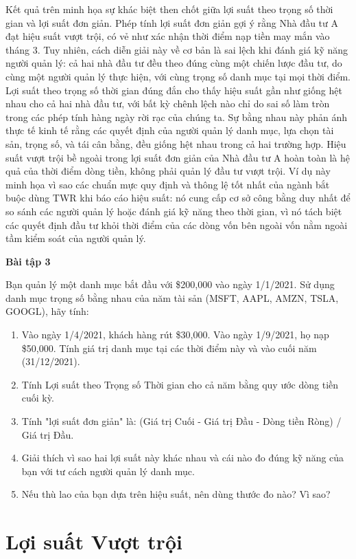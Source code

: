 Kết quả trên minh họa sự khác biệt then chốt giữa lợi suất theo trọng số thời gian và lợi suất đơn giản. Phép tính lợi suất đơn giản gợi ý rằng Nhà đầu tư A đạt hiệu suất vượt trội, có vẻ như xác nhận thời điểm nạp tiền may mắn vào tháng 3. Tuy nhiên, cách diễn giải này về cơ bản là sai lệch khi đánh giá kỹ năng người quản lý: cả hai nhà đầu tư đều theo đúng cùng một chiến lược đầu tư, do cùng một người quản lý thực hiện, với cùng trọng số danh mục tại mọi thời điểm. Lợi suất theo trọng số thời gian đúng đắn cho thấy hiệu suất gần như giống hệt nhau cho cả hai nhà đầu tư, với bất kỳ chênh lệch nào chỉ do sai số làm tròn trong các phép tính hàng ngày rời rạc của chúng ta. Sự bằng nhau này phản ánh thực tế kinh tế rằng các quyết định của người quản lý danh mục, lựa chọn tài sản, trọng số, và tái cân bằng, đều giống hệt nhau trong cả hai trường hợp. Hiệu suất vượt trội bề ngoài trong lợi suất đơn giản của Nhà đầu tư A hoàn toàn là hệ quả của thời điểm dòng tiền, không phải quản lý đầu tư vượt trội. Ví dụ này minh họa vì sao các chuẩn mực quy định và thông lệ tốt nhất của ngành bắt buộc dùng TWR khi báo cáo hiệu suất: nó cung cấp cơ sở công bằng duy nhất để so sánh các người quản lý hoặc đánh giá kỹ năng theo thời gian, vì nó tách biệt các quyết định đầu tư khỏi thời điểm của các dòng vốn bên ngoài vốn nằm ngoài tầm kiểm soát của người quản lý.

\textbf{Bài tập 3}

Bạn quản lý một danh mục bắt đầu với \$200,000 vào ngày 1/1/2021. Sử dụng danh mục trọng số bằng nhau của năm tài sản (MSFT, AAPL, AMZN, TSLA, GOOGL), hãy tính:

\begin{enumerate}
  \item[a)] Vào ngày 1/4/2021, khách hàng rút \$30,000. Vào ngày 1/9/2021, họ nạp \$50,000. Tính giá trị danh mục tại các thời điểm này và vào cuối năm (31/12/2021).
  \item[b)] Tính Lợi suất theo Trọng số Thời gian cho cả năm bằng quy ước dòng tiền cuối kỳ.
  \item[c)] Tính "lợi suất đơn giản" là: (Giá trị Cuối - Giá trị Đầu - Dòng tiền Ròng) / Giá trị Đầu.
  \item[d)] Giải thích vì sao hai lợi suất này khác nhau và cái nào đo đúng kỹ năng của bạn với tư cách người quản lý danh mục.
  \item[e)] Nếu thù lao của bạn dựa trên hiệu suất, nên dùng thước đo nào? Vì sao?
\end{enumerate}

\section{Lợi suất Vượt trội}

